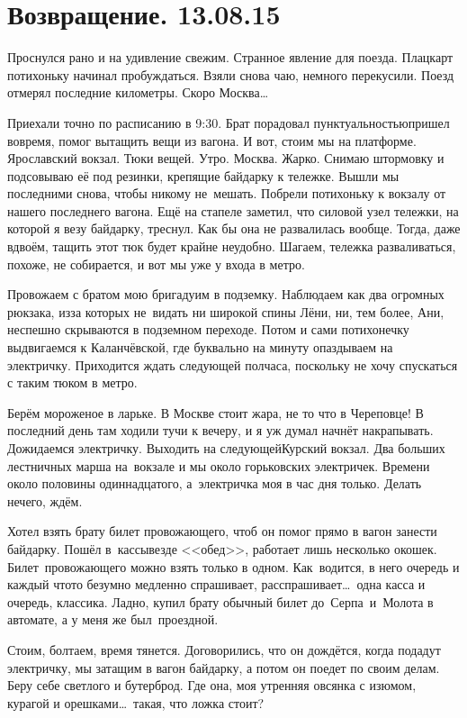 \chapter{Возвращение. 13.08.15}

Проснулся рано и на удивление свежим. Странное явление для поезда. Плацкарт потихоньку начинал пробуждаться. Взяли снова чаю, немного перекусили. Поезд отмерял последние километры. Скоро Москва\ldots~

Приехали точно по расписанию в 9:30. Брат порадовал пунктуальностью\mdash пришел вовремя, помог вытащить вещи из вагона. И вот, стоим мы на платформе. Ярославский вокзал. Тюки вещей. Утро. Москва. Жарко. Снимаю штормовку и подсовываю её под резинки, крепящие байдарку к тележке. Вышли мы последними снова, чтобы никому не~мешать. Побрели потихоньку к вокзалу от нашего последнего вагона. Ещё на стапеле заметил, что силовой узел тележки, на которой я везу байдарку, треснул. Как бы она не развалилась вообще. Тогда, даже вдвоём, тащить этот тюк будет крайне неудобно. Шагаем, тележка разваливаться, похоже, не собирается, и вот мы уже у входа в метро. 

Провожаем с братом мою бригаду\mdash им в подземку. Наблюдаем как два огромных рюкзака, из\sdash за которых не~видать ни широкой спины Лёни, ни, тем более, Ани, неспешно скрываются в подземном переходе. Потом и сами потихонечку выдвигаемся к Каланчёвской, где буквально на минуту опаздываем на электричку. Приходится ждать следующей полчаса, поскольку не хочу спускаться с таким тюком в метро. 

Берём мороженое в ларьке. В Москве стоит жара, не то что в Череповце! В последний день там ходили тучи к вечеру, и я уж думал начнёт накрапывать. Дожидаемся электричку. Выходить на следующей\mdash Курский вокзал. Два больших лестничных марша на~вокзале и мы около горьковских электричек. Времени около половины одиннадцатого, а~электричка моя в час дня только. Делать нечего, ждём. 

Хотел взять брату билет провожающего, чтоб он помог прямо в вагон занести байдарку. Пошёл в~кассы\mdash везде <<обед>>, работает лишь несколько окошек. Билет~провожающего можно взять только в одном. Как~водится, в него очередь и каждый что\sdash то безумно медленно спрашивает, расспрашивает\ldots~одна касса и очередь, классика. Ладно, купил брату обычный билет до~Серпа~и~Молота в автомате, а у меня же был~проездной. 

Стоим, болтаем, время тянется. Договорились, что он дождётся, когда подадут электричку, мы затащим в вагон байдарку, а потом он поедет по своим делам. Беру себе светлого и бутерброд. Где она, моя утренняя овсянка с изюмом, курагой и орешками\ldots~такая, что ложка стоит? 

